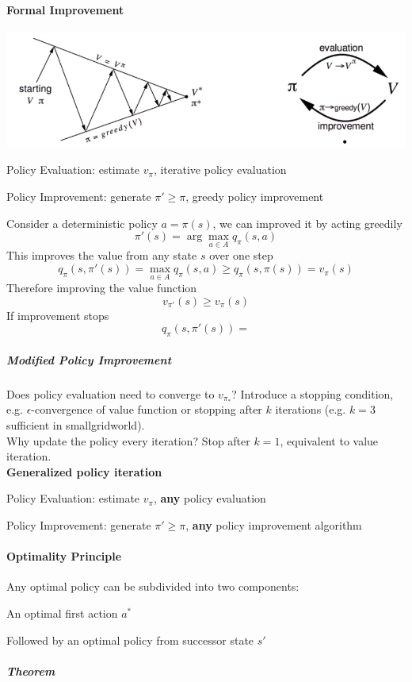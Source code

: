 \documentclass[10pt]{report}
\begin{document}
\paragraph{Formal Improvement}
\begin{center}
	\includegraphics[scale=0.5]{165.png}
\end{center}
\begin{list}{}{}
	\item Policy Evaluation: estimate $v_\pi$, iterative policy evaluation
	\item Policy Improvement: generate $\pi' \geq \pi$, greedy policy improvement
\end{list}
Consider a deterministic policy $a=\pi(s)$, we can improved it by acting greedily $$\pi'(s)=\arg\max_{a\in A} q_\pi(s,a)$$
This improves the value from any state $s$ over one step $$q_\pi(s,\pi'(s)) = \max_{a\in A} q_\pi(s,a)\geq q_\pi(s,\pi(s)) = v_\pi(s)$$
Therefore improving the value function
$$v_{\pi'}(s)\geq v_\pi(s)$$
If improvement stops
$$q_\pi(s,\pi'(s)) =$$ %
\subparagraph{Modified Policy Improvement} Does policy evaluation need to converge to $v_{\pi_*}$? Introduce a stopping condition, e.g. $\epsilon$-convergence of value function or stopping after $k$ iterations (e.g. $k=3$ sufficient in smallgridworld).\\
Why update the policy every iteration? Stop after $k=1$, equivalent to value iteration.\\
\textbf{Generalized policy iteration}\begin{list}{}{}
	\item Policy Evaluation: estimate $v_\pi$, \textbf{any} policy evaluation
	\item Policy Improvement: generate $\pi' \geq \pi$, \textbf{any} policy improvement algorithm
\end{list}
\paragraph{Optimality Principle} Any optimal policy can be subdivided into two components:
\begin{list}{}{}
	\item An optimal first action $a^*$
	\item Followed by an optimal policy from successor state $s'$
\end{list}
\subparagraph{Theorem} %
\end{document}
